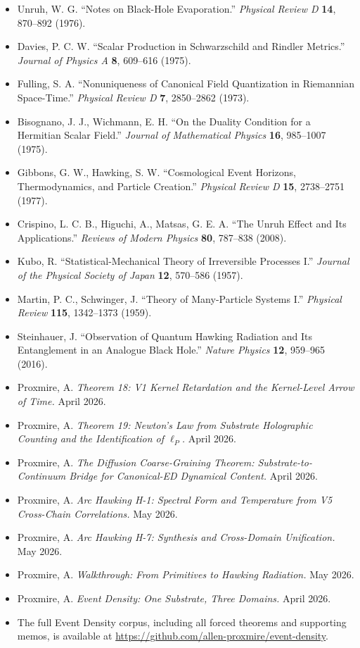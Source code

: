 \documentclass[11pt,a4paper]{article}
\begin{document}
\begin{itemize}[noitemsep]
\item Unruh, W. G. ``Notes on Black-Hole Evaporation.'' \textit{Physical Review D} \textbf{14}, 870--892 (1976).
\item Davies, P. C. W. ``Scalar Production in Schwarzschild and Rindler Metrics.'' \textit{Journal of Physics A} \textbf{8}, 609--616 (1975).
\item Fulling, S. A. ``Nonuniqueness of Canonical Field Quantization in Riemannian Space-Time.'' \textit{Physical Review D} \textbf{7}, 2850--2862 (1973).
\item Bisognano, J. J., Wichmann, E. H. ``On the Duality Condition for a Hermitian Scalar Field.'' \textit{Journal of Mathematical Physics} \textbf{16}, 985--1007 (1975).
\item Gibbons, G. W., Hawking, S. W. ``Cosmological Event Horizons, Thermodynamics, and Particle Creation.'' \textit{Physical Review D} \textbf{15}, 2738--2751 (1977).
\item Crispino, L. C. B., Higuchi, A., Matsas, G. E. A. ``The Unruh Effect and Its Applications.'' \textit{Reviews of Modern Physics} \textbf{80}, 787--838 (2008).
\item Kubo, R. ``Statistical-Mechanical Theory of Irreversible Processes I.'' \textit{Journal of the Physical Society of Japan} \textbf{12}, 570--586 (1957).
\item Martin, P. C., Schwinger, J. ``Theory of Many-Particle Systems I.'' \textit{Physical Review} \textbf{115}, 1342--1373 (1959).
\item Steinhauer, J. ``Observation of Quantum Hawking Radiation and Its Entanglement in an Analogue Black Hole.'' \textit{Nature Physics} \textbf{12}, 959--965 (2016).
\item Proxmire, A. \textit{Theorem 18: V1 Kernel Retardation and the Kernel-Level Arrow of Time.} April 2026.
\item Proxmire, A. \textit{Theorem 19: Newton's Law from Substrate Holographic Counting and the Identification of $\ell_P$.} April 2026.
\item Proxmire, A. \textit{The Diffusion Coarse-Graining Theorem: Substrate-to-Continuum Bridge for Canonical-ED Dynamical Content.} April 2026.
\item Proxmire, A. \textit{Arc Hawking H-1: Spectral Form and Temperature from V5 Cross-Chain Correlations.} May 2026.
\item Proxmire, A. \textit{Arc Hawking H-7: Synthesis and Cross-Domain Unification.} May 2026.
\item Proxmire, A. \textit{Walkthrough: From Primitives to Hawking Radiation.} May 2026.
\item Proxmire, A. \textit{Event Density: One Substrate, Three Domains.} April 2026.
\item The full Event Density corpus, including all forced theorems and supporting memos, is available at \url{https://github.com/allen-proxmire/event-density}.
\end{itemize}
\end{document}
